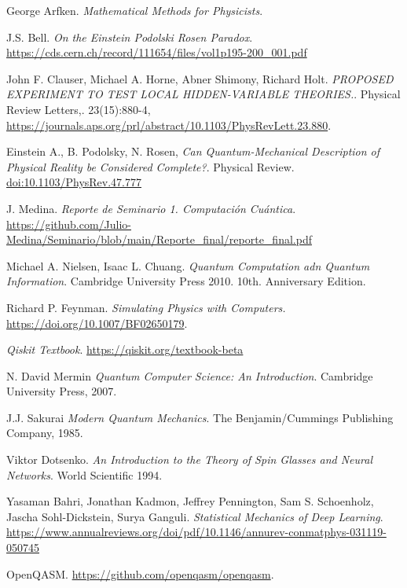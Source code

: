 \documentclass[a4paper]{article}
\begin{document}
\begin{thebibliography}{99}
 George Arfken. \textit{Mathematical Methods for Physicists}.

 J.S. Bell. \textit{On the Einstein Podolski Rosen Paradox}. \url{https://cds.cern.ch/record/111654/files/vol1p195-200_001.pdf}

 John F. Clauser, Michael A. Horne, Abner Shimony, Richard Holt. \textit{PROPOSED EXPERIMENT TO TEST LOCAL HIDDEN-VARIABLE THEORIES.}. Physical Review Letters,. 23(15):880-4, \url{https://journals.aps.org/prl/abstract/10.1103/PhysRevLett.23.880}.

 Einstein A., B. Podolsky, N. Rosen, \textit{Can Quantum-Mechanical Description of Physical Reality be Considered Complete?}. Physical Review. \url{doi:10.1103/PhysRev.47.777}

 J. Medina. \textit{Reporte de Seminario 1. Computación Cuántica}. \url{https://github.com/Julio-Medina/Seminario/blob/main/Reporte_final/reporte_final.pdf}

 Michael A. Nielsen, Isaac L. Chuang. \textit{Quantum Computation adn Quantum Information}. Cambridge University Press 2010. 10th. Anniversary Edition.

 Richard P. Feynman. \textit{Simulating Physics with Computers.} \url{https://doi.org/10.1007/BF02650179}.

 \textit{Qiskit Textbook}. \url{https://qiskit.org/textbook-beta}

 N. David Mermin \textit{Quantum Computer Science: An Introduction}. Cambridge University Press, 2007.

 J.J. Sakurai \textit{Modern Quantum Mechanics}. The Benjamin/Cummings Publishing Company, 1985.

 Viktor Dotsenko. \textit{An Introduction to the Theory of Spin Glasses and Neural Networks}. World Scientific 1994.

 Yasaman Bahri, Jonathan Kadmon, Jeffrey Pennington, Sam S. Schoenholz, Jascha Sohl-Dickstein, Surya Ganguli. \textit{Statistical Mechanics of Deep Learning}. \url{https://www.annualreviews.org/doi/pdf/10.1146/annurev-conmatphys-031119-050745}

 OpenQASM. \url{https://github.com/openqasm/openqasm}.
 

\end{thebibliography}
\end{document}
